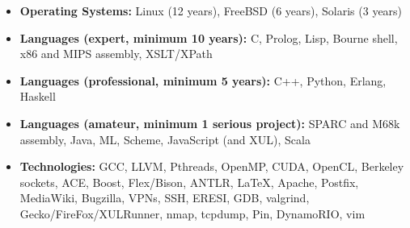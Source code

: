 \documentclass{article}
\newenvironment{tightitemize}
{\begin{itemize}
  \setlength{\itemsep}{1pt}
  \setlength{\parskip}{0pt}
  \setlength{\parsep}{0pt}}
{\end{itemize}}
\begin{document}
\vfill
\begin{tightitemize}
\item \textbf{Operating Systems:} Linux (12 years), FreeBSD (6 years), Solaris (3 years)
\item \textbf{Languages (expert, minimum 10 years):} C, Prolog, Lisp, Bourne shell, x86 and MIPS assembly, XSLT/XPath
\item \textbf{Languages (professional, minimum 5 years):} C++, Python, Erlang, Haskell
\item \textbf{Languages (amateur, minimum 1 serious project):} SPARC and M68k assembly, Java, ML, Scheme, JavaScript (and XUL), Scala
\item \textbf{Technologies:} GCC, LLVM, Pthreads, OpenMP, CUDA, OpenCL, Berkeley sockets, ACE, Boost, Flex/Bison, ANTLR, \LaTeX, Apache, Postfix, MediaWiki, Bugzilla, VPNs, SSH, ERESI, GDB, valgrind, Gecko/FireFox/XULRunner, nmap, tcpdump, Pin, DynamoRIO, vim
\end{tightitemize}
\end{document}
